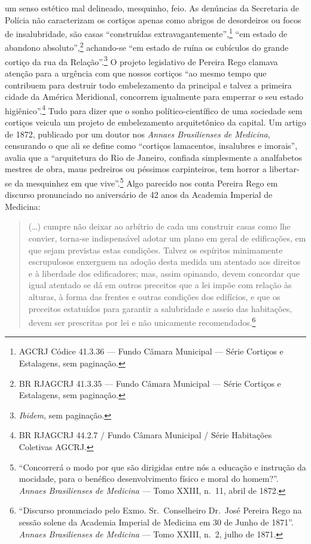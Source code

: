 um senso estético mal delineado, mesquinho, feio. As denúncias da
Secretaria de Polícia não caracterizam os cortiços apenas como abrigos
de desordeiros ou focos de insalubridade, são casas ``construídas
extravagantemente'',\footnote{AGCRJ Códice 41.3.36 --- Fundo Câmara
  Municipal --- Série Cortiços e Estalagens, sem paginação.} ``em estado
de abandono absoluto'',\footnote{BR RJAGCRJ 41.3.35 --- Fundo Câmara
  Municipal --- Série Cortiços e Estalagens, sem paginação.} achando-se
``em estado de ruína os cubículos do grande cortiço da rua da
Relação''.\footnote{\textit{Ibidem}, sem paginação.} O projeto legislativo
de Pereira Rego clamava atenção para a urgência com que nossos cortiços
``ao mesmo tempo que contribuem para destruir todo embelezamento da
principal e talvez a primeira cidade da América Meridional, concorrem
igualmente para emperrar o seu estado higiênico''.\footnote{BR RJAGCRJ
  44.2.7 / Fundo Câmara Municipal / Série Habitações Coletivas AGCRJ.}
Tudo para dizer que o sonho político-científico de uma sociedade sem
cortiços veicula um projeto de embelezamento arquitetônico da capital.
Um artigo de 1872, publicado por um doutor nos \textit{Annaes Brasilienses
de Medicina}, censurando o que ali se define como ``cortiços lamacentos,
insalubres e imorais'', avalia que a ``arquitetura do Rio de Janeiro,
confiada simplesmente a analfabetos mestres de obra, maus pedreiros ou
péssimos carpinteiros, tem horror a libertar-se da mesquinhez em que
vive''.\footnote{``Concorrerá o modo por que são dirigidas entre nós a
  educação e instrução da mocidade, para o benéfico desenvolvimento
  físico e moral do homem?''. \textit{Annaes Brasilienses de Medicina} ---
  Tomo XXIII, n.~11, abril de 1872.} Algo parecido nos conta Pereira
Rego em discurso pronunciado no aniversário de 42 anos da Academia
Imperial de Medicina:

\begin{quote}
(\ldots{}) cumpre não deixar ao arbítrio de cada um construir casas como
lhe convier, torna-se indispensável adotar um plano em geral de
edificações, em que sejam previstas estas condições. Talvez os espíritos
minimamente escrupulosos enxerguem na adoção desta medida um atentado
aos direitos e à liberdade dos edificadores; mas, assim opinando, devem
concordar que igual atentado se dá em outros preceitos que a lei impõe
com relação às alturas, à forma das frentes e outras condições dos
edifícios, e que os preceitos estatuídos para garantir a salubridade e
asseio das habitações, devem ser prescritas por lei e não unicamente
recomendados.\footnote{``Discurso pronunciado pelo Exmo. Sr.~Conselheiro
  Dr.~José Pereira Rego na sessão solene da Academia Imperial de
  Medicina em 30 de Junho de 1871''. \textit{Annaes Brasilienses de
  Medicina} --- Tomo XXIII, n.~2, julho de 1871.}
\end{quote}


